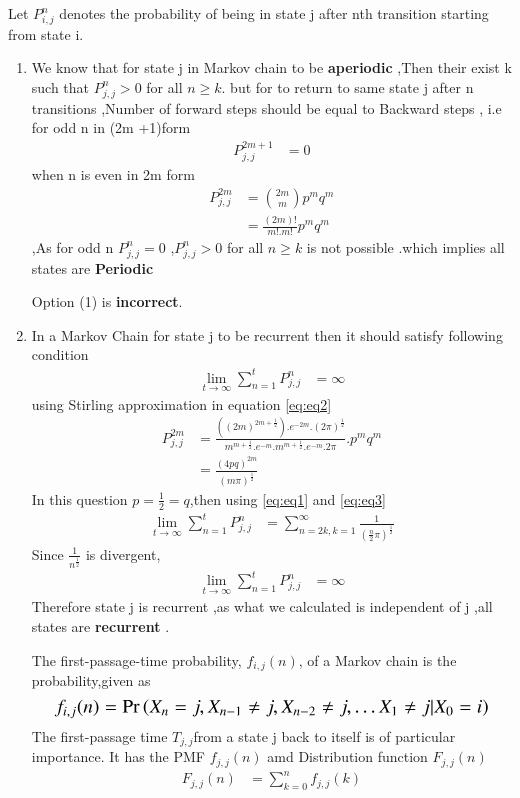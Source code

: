 \documentclass[journal,12pt,twocolumn]{IEEEtran}
\begin{document}
Let $P_{i,j}^{n}$ denotes the probability of being in state j after nth transition starting from state i.
\begin{enumerate}
    \item We know that for state j in Markov chain to be \textbf{aperiodic} ,Then their  exist k such that $P_{j,j}^{n} > 0$ for all $n \geq k$. but for to return to same state j after n transitions  ,Number of forward steps should be equal to Backward steps , i.e for odd n in (2m +1)form
    \begin{align}
        P_{j,j}^{2m+1}&=0  
        \label{eq:eq1}
    \end{align}
    when n is even in 2m form
    \begin{align}
        P_{j,j}^{2m}&=\binom{2m}{m}p^{m}q^{m}
     \\
     &=\frac{(2m)!}{m!.m!}p^{m}q^{m}
     \label{eq:eq2}
    \end{align}
    ,As for odd n $P_{j,j}^{n} = 0$ ,$P_{j,j}^{n} > 0$ for all $n \geq k$ is not possible .which implies  all states are \textbf{Periodic}
  
    Option (1) is \textbf{incorrect}. 
    \item 
In a Markov Chain for state j to be recurrent then it should satisfy following condition
\begin{align}
     \lim_{t\to\infty}\sum_{n=1}^t P_{j,j}^{n}&=\infty
\end{align}
using Stirling approximation in equation \eqref{eq:eq2} 
\begin{align}
    P_{j,j}^{2m} &=\frac{((2m)^{2m +\frac{1}{2}}).e^{-2m}.(2\pi)^{\frac{1}{2}}}{m^{m+\frac{1}{2}}.e^{-m}.m^{m+\frac{1}{2}}.e^{-m}.2\pi}.p^{m}q^{m}
    \\
    &=\frac{(4pq)^{2m}}{(m\pi)^{\frac{1}{2}}}
    \label{eq:eq3}
\end{align}
In this question $p =\frac{1}{2}=q$,then using \eqref{eq:eq1} and \eqref{eq:eq3}
\begin{align}
    \lim_{t\to\infty}\sum_{n=1}^t P_{j,j}^{n}&=\sum_{n=2k,k=1}^{\infty}\frac{1}{(\frac{n}{2}\pi)^{\frac{1}{2}}}
\end{align}
Since $\frac{1}{n^{\frac{1}{2}}}$ is divergent,
\begin{align}
     \lim_{t\to\infty}\sum_{n=1}^t P_{j,j}^{n}& = \infty
\end{align}
Therefore state j is recurrent ,as what we calculated is independent of j ,all states are \textbf{recurrent }.

The first-passage-time probability, $f_{i,j}(n)$, of a Markov chain is the probability,given as 
\begin{equation}
\resizebox{.9\hsize}{!}{$f_{i,j}(n)=\pr{X_{n}=j,X_{n-1}\neq j,X_{n-2}\neq j,\dots X_{1}\neq j|X_{0}=i}$}
\end{equation}
The first-passage time $T_{j,j}$from a state j back to itself is of particular importance. It has the PMF $f_{j,j}(n)$ amd Distribution function $F_{j,j}(n)$
\begin{align}
    F_{j,j}(n)&=\sum_{k=0}^n f_{j,j}(k)
    \label{eq:eq4}
\end{align}


\end{enumerate}
\end{document}
